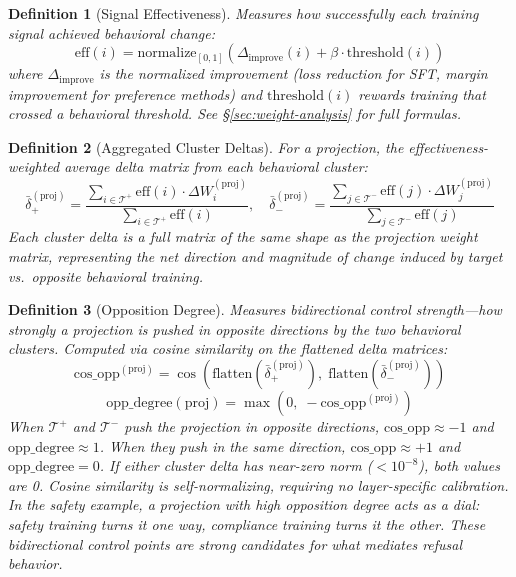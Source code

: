 \documentclass[11pt]{article}
\newtheorem{definition}{Definition}[section]
\begin{document}
\begin{definition}[Signal Effectiveness]
\label{def:signal-effectiveness-discovery}
Measures how successfully each training signal achieved behavioral change:
\begin{equation}
\text{eff}(i) = \text{normalize}_{[0,1]}\left(\Delta_{\text{improve}}(i) + \beta \cdot \text{threshold}(i)\right)
\end{equation}
where $\Delta_{\text{improve}}$ is the normalized improvement (loss reduction for SFT, margin improvement for preference methods) and $\text{threshold}(i)$ rewards training that crossed a behavioral threshold. See \S\ref{sec:weight-analysis} for full formulas.
\end{definition}

\begin{definition}[Aggregated Cluster Deltas]
\label{def:cluster-deltas}
For a projection, the effectiveness-weighted average delta matrix from each behavioral cluster:
\begin{equation}
\bar{\delta}^{(\text{proj})}_+ = \frac{\sum_{i \in \mathcal{T}^+} \text{eff}(i) \cdot \Delta W^{(\text{proj})}_i}{\sum_{i \in \mathcal{T}^+} \text{eff}(i)}, \quad \bar{\delta}^{(\text{proj})}_- = \frac{\sum_{j \in \mathcal{T}^-} \text{eff}(j) \cdot \Delta W^{(\text{proj})}_j}{\sum_{j \in \mathcal{T}^-} \text{eff}(j)}
\end{equation}
Each cluster delta is a full matrix of the same shape as the projection weight matrix, representing the net direction and magnitude of change induced by target vs.\ opposite behavioral training.
\end{definition}

\begin{definition}[Opposition Degree]
\label{def:opposition-degree}
Measures bidirectional control strength---how strongly a projection is pushed in opposite directions by the two behavioral clusters. Computed via cosine similarity on the flattened delta matrices:
\begin{equation}
\text{cos\_opp}^{(\text{proj})} = \cos\!\left(\text{flatten}(\bar{\delta}^{(\text{proj})}_+),\; \text{flatten}(\bar{\delta}^{(\text{proj})}_-)\right)
\end{equation}
\begin{equation}
\text{opp\_degree}(\text{proj}) = \max\!\left(0,\; -\text{cos\_opp}^{(\text{proj})}\right)
\end{equation}
When $\mathcal{T}^+$ and $\mathcal{T}^-$ push the projection in opposite directions, $\text{cos\_opp} \approx -1$ and $\text{opp\_degree} \approx 1$. When they push in the same direction, $\text{cos\_opp} \approx +1$ and $\text{opp\_degree} = 0$. If either cluster delta has near-zero norm ($< 10^{-8}$), both values are 0. Cosine similarity is self-normalizing, requiring no layer-specific calibration. In the safety example, a projection with high opposition degree acts as a dial: safety training turns it one way, compliance training turns it the other. These bidirectional control points are strong candidates for what mediates refusal behavior.
\end{definition}
\end{document}
